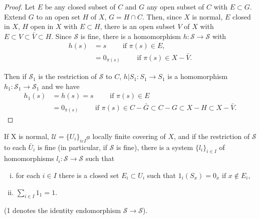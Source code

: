 \begin{proof}%
Let $E$ be any closed subset of $C$ and $G$ any open subset of $C$
with $E \subset G$. Extend $G$ to an open set $H$ of $X$, $G = H \cap
C$. Then, since $X$ is normal, $E$ closed in $X$, $H$ open in $X$ with
$E\subset H$, there is an open subset $V$ of $X$ with $E \subset V
\subset \bar{V} \subset H$. Since $\mathscr{S}$ is fine, there is a
homomorphism  $h : \mathscr{S} \to \mathscr{S}$ with 
\begin{align*}
 h (s) & = s \qquad \text{ if } \pi (s) \in E,\\
 & = 0_{\pi (s)}\qquad  \text{ if } \pi (s) \in X - \bar{V}.
 \end{align*}\pageoriginale
 
Then if $\mathscr{S}_1$ is the restriction of $\mathscr{S}$ to $C$, $h |
S_1 : S_1 \to S_1$ is a homomorphism $h_1: \mathscr{S}_1 \to
\mathscr{S}_1$ and we have 
\begin{align*}
h_1 (s) &= h(s) = s \qquad \text{ if } \pi (s) \in E\\ 
& = 0_{\pi (s)} \qquad \text{ if } \pi (s) \in C - \bar{G}
\subset C -G \subset X -H \subset X -\bar{V}. 
\end{align*}
\end{proof}

\begin{proposition}%
If X is normal, $\mathscr{U} = \{ U_i\}_{i \varepsilon I}
  \underbar{a}$ locally finite covering of $X$, and if the restriction
  of $\mathscr{S}$ to each $\bar{U}_i$ is fine (in particular, if
  $\mathscr{S}$ is fine), there is a system $\{ l_i\}_{i \in
    I}$ of homomorphisms $l_i : \mathscr{S} \to \mathscr{S}$ such
that 
\begin{enumerate}[i)]
\item for each $i \in I$ there is a closed set $E_i \subset
  U_i$ such that $ 1_i (S_x) = 0_x \text{ if } x \notin E_i$, 

\item $\sum\limits_{i \in I} 1_1 = 1$.
\end{enumerate}

(1 denotes the identity endomorphism $\mathscr{S} \to \mathscr{S}$).
\end{proposition}

